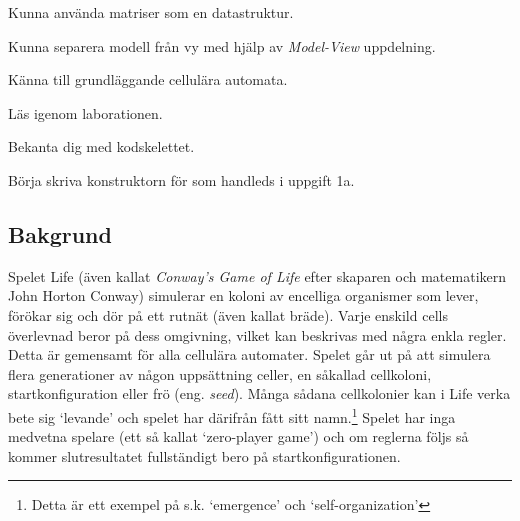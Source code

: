 


\Lab{\LabWeekTWELVE}

\begin{Goals}
    \item Kunna använda matriser som en datastruktur.
    \item Kunna separera modell från vy med hjälp av \emph{Model-View} uppdelning.
    \item Känna till grundläggande cellulära automata. %
\end{Goals}


\begin{Preparations}
    \item Läs igenom laborationen.
    \item Bekanta dig med kodskelettet.
    \item Börja skriva konstruktorn för  som handleds i uppgift 1a.
\end{Preparations}

\subsection{Bakgrund}

Spelet Life (även kallat \emph{Conway's Game of Life} efter skaparen och matematikern John Horton Conway) simulerar en koloni av encelliga organismer som lever, förökar sig och dör på ett rutnät (även kallat bräde). Varje enskild cells överlevnad beror på dess omgivning, vilket kan beskrivas med några enkla regler. Detta är gemensamt för alla cellulära automater. Spelet går ut på att simulera flera generationer av någon uppsättning celler, en såkallad cellkoloni, startkonfiguration eller frö (eng. \textit{seed}). Många sådana cellkolonier kan i Life verka bete sig `levande' och spelet har därifrån fått sitt namn.\footnote{Detta är ett exempel på s.k. `emergence' och `self-organization'} Spelet har inga medvetna spelare (ett så kallat `zero-player game') och om reglerna följs så kommer slutresultatet fullständigt bero på startkonfigurationen.

